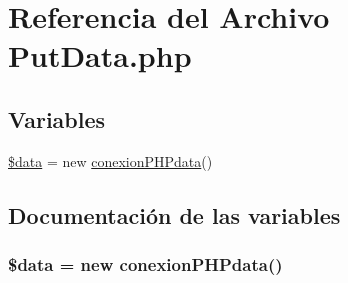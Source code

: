 \hypertarget{PutData_8php}{\section{Referencia del Archivo Put\-Data.\-php}
\label{PutData_8php}
}
\subsection*{Variables}
\begin{DoxyCompactItemize}
\item 
\hyperlink{PutData_8php_a6efc15b5a2314dd4b5aaa556a375c6d6}{\$data} = new \hyperlink{classconexionPHPdata}{conexion\-P\-H\-Pdata}()
\end{DoxyCompactItemize}


\subsection{Documentación de las variables}
\hypertarget{PutData_8php_a6efc15b5a2314dd4b5aaa556a375c6d6}{
\subsubsection[{\$data}]{\setlength{\rightskip}{0pt plus 5cm}\$data = new {\bf conexion\-P\-H\-Pdata}()}}\label{PutData_8php_a6efc15b5a2314dd4b5aaa556a375c6d6}
